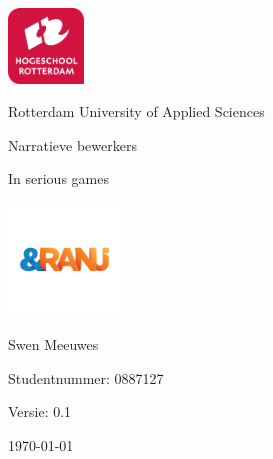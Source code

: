 \documentclass{report}
\newcommand{\versionnumber}{0.1}
\newcommand{\name}{Swen Meeuwes}
\newcommand{\studentnumber}{0887127}
\newcommand{\institution}{Rotterdam University of Applied Sciences}
\renewcommand{\title}{Narratieve bewerkers}
\newcommand{\subtitle}{In serious games}
\begin{document}
\begin{titlepage}
        \centering
        \includegraphics[width=2cm]{University}\par
        \institution{}
        \vspace{4\baselineskip}
        {\Huge\title\par}
        {\Large\subtitle\par}
        \par
        \includegraphics[width=3cm]{Organisation}
        \vspace{4\baselineskip}
        \par
        {\Large\name\par}
        {Studentnummer: \studentnumber\par}
        \vfill
        {\hfill Versie: \versionnumber\par}
        {\hfill \today}
        \thispagestyle{empty}
\end{titlepage}




\tableofcontents




















\end{document}

